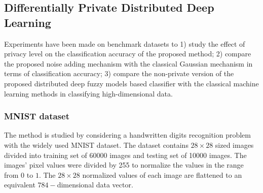 \subsection{Differentially Private Distributed Deep Learning}
Experiments have been made on benchmark datasets to 1) study the effect of privacy level on the classification accuracy of the proposed method; 2) compare the proposed noise adding mechanism with the classical Gaussian mechanism in terms of classification accuracy; 3) compare the non-private version of the proposed distributed deep fuzzy models based classifier with the classical machine learning methods in classifying high-dimensional data.   

\subsubsection{MNIST dataset}
The method is studied by considering a handwritten digits recognition problem with the widely used MNIST dataset. The dataset contains $28 \times 28$ sized images divided into training set of 60000 images and testing set of 10000 images. The images' pixel values were divided by 255 to normalize the values in the range from $0$ to $1$. The $28 \times 28$ normalized values of each image are flattened to an equivalent $784-$dimensional data vector.

